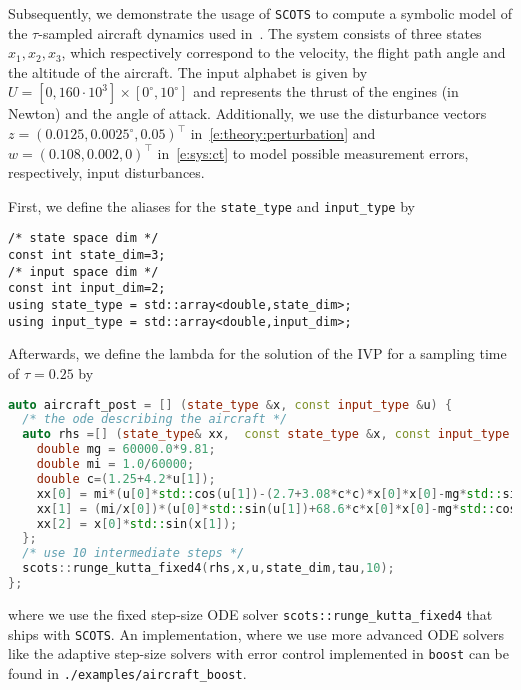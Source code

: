 \documentclass[a4paper]{amsart}
\newcommand{\intcc}[1]{\ensuremath{{\left[#1\right]}}}
\begin{document}
Subsequently, we demonstrate the usage of {\tt SCOTS} to compute a symbolic
model of the $\tau$-sampled aircraft dynamics used
in~\cite[Sec.~IX.B]{ReissigWeberRungger15}. The system consists of three states $x_1,x_2,x_3$, which respectively correspond to the velocity, the flight path angle and the altitude of the
aircraft. The input alphabet is given by $U =
\intcc{0,160\cdot 10^3} \times \intcc{0^\circ,10^\circ}$ 
and represents the thrust of the engines (in Newton) and the angle of attack.
Additionally, we use the disturbance vectors $z=(0.0125,0.0025^\circ,0.05)^\top$
in~\eqref{e:theory:perturbation} and $w=(0.108,0.002,0)^\top$
in~\eqref{e:sys:ct} to model possible measurement errors, respectively, input
disturbances.

First, we define the aliases for the {\tt state\_type} and {\tt input\_type} by
\begin{lstlisting}[basicstyle=\small\ttfamily]
/* state space dim */
const int state_dim=3;
/* input space dim */
const int input_dim=2;
using state_type = std::array<double,state_dim>;
using input_type = std::array<double,input_dim>;
\end{lstlisting}
Afterwards, we define the lambda for the solution of the IVP for a
sampling time of $\tau=0.25$ by
\begin{lstlisting}[basicstyle=\small\ttfamily, language=C++]
auto aircraft_post = [] (state_type &x, const input_type &u) {
  /* the ode describing the aircraft */
  auto rhs =[] (state_type& xx,  const state_type &x, const input_type &u) {
    double mg = 60000.0*9.81;
    double mi = 1.0/60000;
    double c=(1.25+4.2*u[1]);
    xx[0] = mi*(u[0]*std::cos(u[1])-(2.7+3.08*c*c)*x[0]*x[0]-mg*std::sin(x[1]));
    xx[1] = (mi/x[0])*(u[0]*std::sin(u[1])+68.6*c*x[0]*x[0]-mg*std::cos(x[1]));
    xx[2] = x[0]*std::sin(x[1]);
  };
  /* use 10 intermediate steps */
  scots::runge_kutta_fixed4(rhs,x,u,state_dim,tau,10);
};
\end{lstlisting}
where we use the fixed step-size ODE solver {\tt scots::runge\_kutta\_fixed4} that
ships with {\tt SCOTS}. An implementation, where we use more advanced ODE solvers like the
adaptive step-size solvers with error control implemented in {\tt boost} can be found in {\tt ./examples/aircraft\_boost}.
\end{document}
